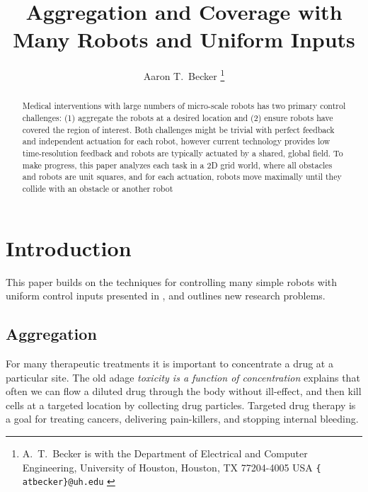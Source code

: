 \documentclass[letterpaper, 10 pt, conference]{ieeeconf}
\begin{document}


\title{\LARGE \bf 
Aggregation and Coverage with Many Robots and Uniform Inputs
}
\author{Aaron T.\ Becker%
\thanks{
{A.\ T.\ Becker is with the Department of Electrical and Computer Engineering,  University of Houston, Houston, TX 77204-4005 USA {\tt\small  \{ atbecker\}@uh.edu}
}
} %
} %
\maketitle

\begin{abstract}
Medical interventions with large numbers of micro-scale robots has two primary control challenges: (1) aggregate the robots at a desired location and (2) ensure robots have covered the region of interest.  Both challenges might be trivial with perfect feedback and independent actuation for each robot, however current technology provides low time-resolution feedback and robots are typically actuated by a shared, global field.  To make progress, this paper analyzes each task in a 2D grid world, where all obstacles and robots are unit squares, and for each actuation, robots move maximally until they collide with an obstacle or another robot
\end{abstract}




  \section{Introduction}
  
  This paper builds on the techniques for controlling many simple robots with uniform control inputs presented in \cite{Becker2013f,Becker2014,Becker2014a}, and outlines new research problems.
  
  \subsection{Aggregation}\label{sec:Aggregation}
For many therapeutic treatments it is important to concentrate a drug at a particular site.  The old adage \emph{toxicity is a function of concentration} explains that often we can flow a diluted drug through the body without ill-effect, and then kill cells at a targeted location by collecting drug particles.  Targeted drug therapy is a goal for treating cancers, delivering pain-killers, and stopping internal bleeding.
  
\end{document}
